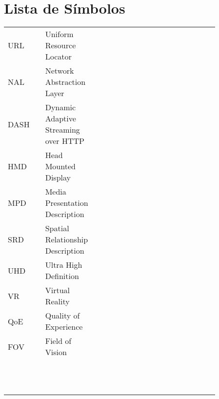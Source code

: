 \chapter*{Lista de Símbolos}

\noindent
\pagestyle{fancy}

\begin{longtable}{l l l p{0.86\linewidth}}
URL 	&   & Uniform Resource Locator & \\
NAL		& 	& Network Abstraction Layer & \\
DASH 	&  	& Dynamic Adaptive Streaming over HTTP & \\
HMD 	&  	& Head Mounted Display & \\
MPD 	&  	& Media Presentation Description & \\
SRD     & 	& Spatial Relationship Description & \\
UHD   	&  	& Ultra High Definition & \\
VR      & 	& Virtual Reality  & \\
QoE     &  	&  Quality of Experience & \\
FOV     &   & Field of Vision & \\
    & 	 &  & \\
    & 	 &  & \\
    & 	 &  & \\
    & 	 &  & \\
    & 	 &  & \\
    & 	 &  & \\
    & 	 &  & \\
    & 	 &  & \\
    & 	 &  & \\
    & 	 &  & \\
    & 	 &  & \\
    & 	 &  & \\


\end{longtable}